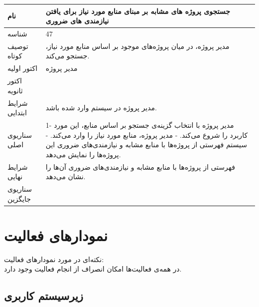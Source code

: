 \documentclass{article}
\begin{document}
\vspace{2cm}

\begin{tabular}{|p{2cm}|p{10cm}|}
\hline
نام
&
جستجوی پروژه های مشابه بر مبنای منابع مورد نیاز برای یافتن نیازمندی های ضروری
\\
\hline
شناسه
&
47
\\
\hline
توصیف کوتاه
&
مدیر پروژه، در میان پروژه‌های موجود بر اساس منابع مورد نیاز، جستجو می‌کند.
\\
\hline
اکتور اولیه
&
مدیر پروژه
\\
\hline
اکتور ثانویه
&

\\
\hline
شرایط ابتدایی
&
مدیر پروژه در سیستم وارد شده باشد.
\\
\hline
سناریوی اصلی
&
1- مدیر پروژه با انتخاب گزینه‌ی جستجو بر اساس منابع، این مورد کاربرد را شروع می‌کند.
\newline
2- مدیر پروژه، منابع مورد نیاز را وارد می‌کند.
\newline
3- سیستم فهرستی از پروژه‌ها با منابع مشابه و نیازمندی‌های ضروری این پروژه‌ها را نمایش می‌دهد.
\\
\hline
شرایط نهایی
&
فهرستی از پروژه‌ها با منابع مشابه و نیازمندی‌های ضروری آن‌ها را نشان می‌دهد.
\\
\hline
سناریوی جایگزین
&

\\
\hline
\end{tabular}

\newpage
\section{نمودارهای فعالیت}

نکته‌ای در مورد نمودارهای فعالیت:
\\
در همه‌ی فعالیت‌ها امکان انصراف از انجام فعالیت وجود دارد.

\vspace{1cm}
\subsection{زیرسیستم کاربری}

\vspace{1cm}
\end{document}
